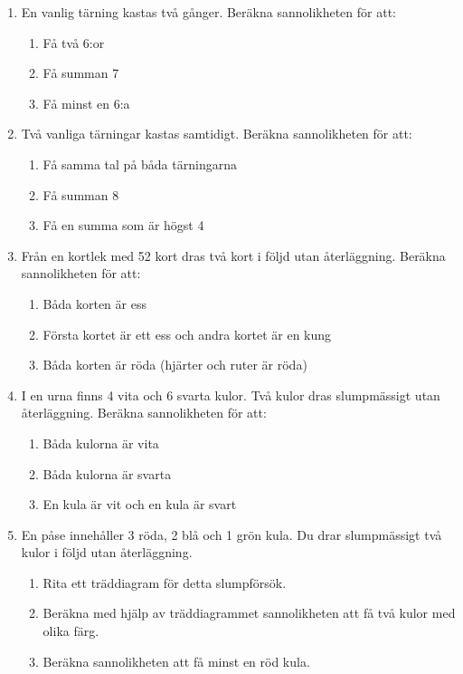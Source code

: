 \documentclass[a4paper,11pt]{article}
\begin{document}
\begin{enumerate}[label=\textbf{\arabic*.}]
    \item En vanlig tärning kastas två gånger. Beräkna sannolikheten för att:
    \begin{enumerate}[label=\alph*)]
        \item Få två 6:or
        \item Få summan 7
        \item Få minst en 6:a
    \end{enumerate}
    
    \item Två vanliga tärningar kastas samtidigt. Beräkna sannolikheten för att:
    \begin{enumerate}[label=\alph*)]
        \item Få samma tal på båda tärningarna
        \item Få summan 8
        \item Få en summa som är högst 4
    \end{enumerate}
    
    \item Från en kortlek med 52 kort dras två kort i följd utan återläggning. Beräkna sannolikheten för att:
    \begin{enumerate}[label=\alph*)]
        \item Båda korten är ess
        \item Första kortet är ett ess och andra kortet är en kung
        \item Båda korten är röda (hjärter och ruter är röda)
    \end{enumerate}
    \break
    \item I en urna finns 4 vita och 6 svarta kulor. Två kulor dras slumpmässigt utan återläggning. Beräkna sannolikheten för att:
    \begin{enumerate}[label=\alph*)]
        \item Båda kulorna är vita
        \item Båda kulorna är svarta
        \item En kula är vit och en kula är svart
    \end{enumerate}
    
    \item En påse innehåller 3 röda, 2 blå och 1 grön kula. Du drar slumpmässigt två kulor i följd utan återläggning.
    \begin{enumerate}[label=\alph*)]
        \item Rita ett träddiagram för detta slumpförsök.
        \item Beräkna med hjälp av träddiagrammet sannolikheten att få två kulor med olika färg.
        \item Beräkna sannolikheten att få minst en röd kula.
    \end{enumerate}
    

\end{enumerate}
\end{document}

